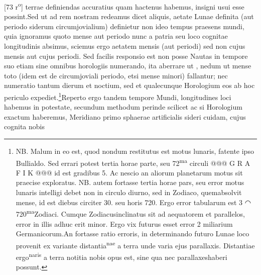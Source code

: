 [73 r\textsuperscript{o}] terrae definiendas accuratius quam hactenus habemus, insigni usui esse possint.\pend \pstart Sed ut ad rem nostram redeamus dicet aliquis, aetate Lunae\protect{} definita (aut periodo siderum circumjovialium) definietur non ideo tempus praesens mundi, quia ignoramus quoto mense aut periodo nunc a patria seu loco cognitae longitudinis\protect{} absimus, sciemus ergo aetatem mensis (aut periodi) sed non cujus mensis aut cujus periodi. Sed facilis responsio est non posse Nautas in tempore suo etiam sine omnibus horologiis\protect{} numerando, ita aberrare ut , nedum ut mense toto (idem est de circumjoviali periodo, etsi mense minori) fallantur; nec numeratio tantum dierum et noctium, sed et qualecunque Horologium\protect{} eos ab hoc periculo expediet.\footnote{NB. Malum in eo est, quod nondum restitutus est motus lunaris, fatente ipso Bullialdo\protect{}. Sed errari potest tertia horae parte, seu 72\textsuperscript{ma} circuli @@@ G R A F I K @@@ id est gradibus 5. Ac nescio an aliorum planetarum motus sit praecise exploratus. NB. autem fortasse tertia horae pars, seu error motus lunaris intelligi debet non in circulo diurno, sed in Zodiaco\protect{}, quem\rightmoon absolvit mense, id est diebus circiter 30. seu horis 720. Ergo error tabularum est 3 ◠ 720\textsuperscript{ma}Zodiaci\protect{}. Cumque Zodiacus\protect{}inclinatus sit ad aequatorem\protect{} et parallelos\protect{}, error in illis adhuc erit minor. Ergo vix futurus esset error 2 miliarium Germanicorum.An fortasse ratio erroris, in determinando futuro Lunae\protect{} loco provenit ex variante distantia\rightmoon\textsuperscript{nae} a terra unde varia ejus parallaxis\protect{}. Distantiae ergo\rightmoon\textsuperscript{naris} a terra notitia nobis opus est, sine qua nec parallaxes\protect{}haberi possunt.}\pend \pstart Reperto ergo tandem tempore Mundi, longitudines\protect{} loci habemus in potestate, secundum methodum  perinde scilicet ac si Horologium\protect{} exactum haberemus, Meridiano\protect{}  primo sphaerae artificialis  sideri\protect{} cuidam, cujus cognita nobis 
